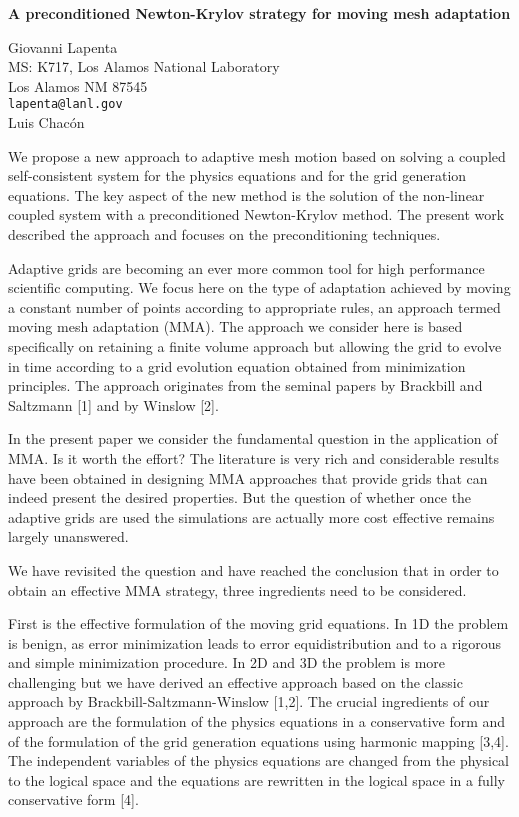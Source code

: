 \documentclass{report}
\begin{document}

\begin{center}
{\large
{\bf A preconditioned Newton-Krylov strategy for moving mesh adaptation}}

	Giovanni Lapenta \\
	MS: K717, Los Alamos National Laboratory \\
	Los Alamos NM 87545 \\
	{\tt lapenta@lanl.gov} \\
	Luis Chac\'on
\end{center}
We propose a new approach to adaptive mesh motion based on
solving a coupled self-consistent system for the physics
equations and for the grid generation equations. The key
aspect of the new method is the solution of the non-linear
coupled system with a preconditioned Newton-Krylov method.
The present work described the approach and focuses on the
preconditioning techniques.

Adaptive grids are becoming
an ever more common tool for high performance scientific
computing. We focus here on the type of adaptation achieved
by moving a constant number of points according to
appropriate rules, an approach termed moving mesh adaptation
(MMA). The approach we consider here is based specifically
on retaining a finite volume approach but allowing the grid
to evolve in time according to a grid evolution equation
obtained from minimization principles. The approach
originates from the seminal papers by Brackbill and
Saltzmann [1] and by Winslow [2].

In the present paper we
consider the fundamental question in the application of MMA.
Is it worth the effort? The literature is very rich and
considerable results have been obtained in designing MMA
approaches that provide grids that can indeed present the
desired properties. But the question of whether once the
adaptive grids are used the simulations are actually more
cost effective remains largely unanswered.

We have
revisited the question and have reached the conclusion that
in order to obtain an effective MMA strategy, three
ingredients need to be considered.

First is the effective
formulation of the moving grid equations. In 1D the problem
is benign, as error minimization leads to error
equidistribution and to a rigorous and simple minimization
procedure. In 2D and 3D the problem is more challenging but
we have derived an effective approach based on the classic
approach by Brackbill-Saltzmann-Winslow [1,2]. The crucial
ingredients of our approach are the formulation of the
physics equations in a conservative form and of the
formulation of the grid generation equations using harmonic
mapping [3,4]. The independent variables of the physics
equations are changed from the physical to the logical space
and the equations are rewritten in the logical space in a
fully conservative form [4].
\end{document}
